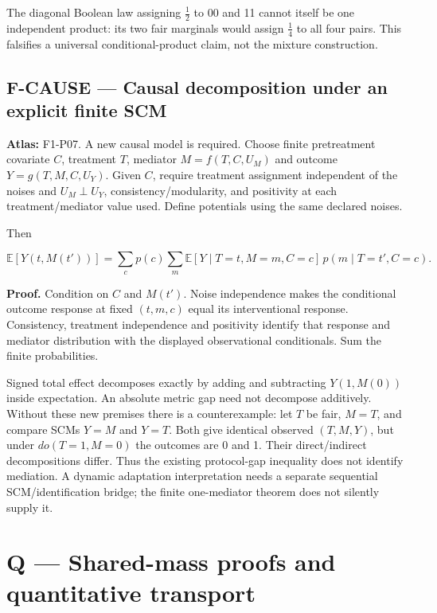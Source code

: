 \documentclass[
  11pt,
  a4paper,
]{article}
\begin{document}
The diagonal Boolean law assigning \(\frac{1}{2}\) to 00 and 11 cannot
itself be one independent product: its two fair marginals would assign
\(\frac{1}{4}\) to all four pairs. This falsifies a universal
conditional-product claim, not the mixture construction.

\subsection{F-CAUSE --- Causal decomposition under an explicit finite
SCM}\label{f-cause-causal-decomposition-under-an-explicit-finite-scm}

\textbf{Atlas:} F1-P07. A new causal model is required. Choose finite
pretreatment covariate \(C\), treatment \(T\), mediator \(M=f(T,C,U_M)\)
and outcome \(Y=g(T,M,C,U_Y)\). Given \(C\), require treatment
assignment independent of the noises and \(U_M\perp U_Y\),
consistency/modularity, and positivity at each treatment/mediator value
used. Define potentials using the same declared noises.

Then

\[\mathbb E[Y(t,M(t'))]=
\sum_c p(c)\sum_m
\mathbb E[Y\mid T=t,M=m,C=c]\,
 p(m\mid T=t',C=c).\]

\textbf{Proof.} Condition on \(C\) and \(M(t')\). Noise independence
makes the conditional outcome response at fixed \((t,m,c)\) equal its
interventional response. Consistency, treatment independence and
positivity identify that response and mediator distribution with the
displayed observational conditionals. Sum the finite probabilities.

Signed total effect decomposes exactly by adding and subtracting
\(Y(1,M(0))\) inside expectation. An absolute metric gap need not
decompose additively. Without these new premises there is a
counterexample: let \(T\) be fair, \(M=T\), and compare SCMs \(Y=M\) and
\(Y=T\). Both give identical observed \((T,M,Y)\), but under
\(do(T=1,M=0)\) the outcomes are 0 and 1. Their direct/indirect
decompositions differ. Thus the existing protocol-gap inequality does
not identify mediation. A dynamic adaptation interpretation needs a
separate sequential SCM/identification bridge; the finite one-mediator
theorem does not silently supply it.

\newpage

\section{Q --- Shared-mass proofs and quantitative
transport}\label{q-shared-mass-proofs-and-quantitative-transport}
\end{document}
